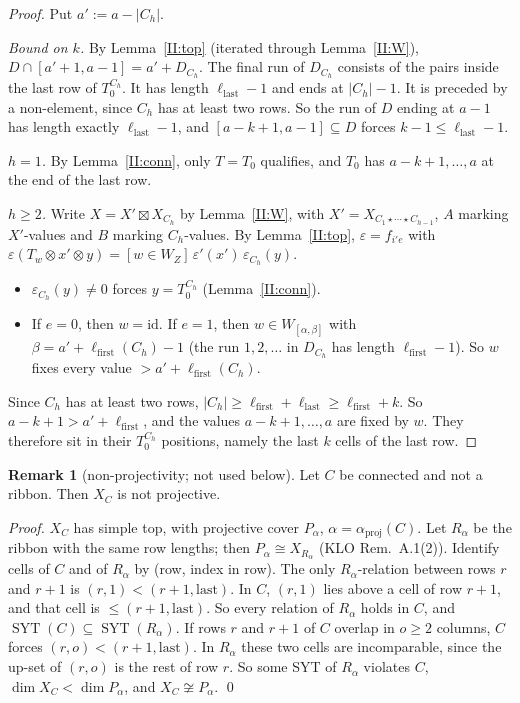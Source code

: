 \documentclass[11pt]{amsart}
\newcommand{\SYT}{\operatorname{SYT}}
\newcommand{\sq}{\boxtimes}
\theoremstyle{plain}
\theoremstyle{definition}
\newtheorem{remarkII}[lemmaII]{Remark}
\begin{document}
\begin{proof}
Put $a':=a-|C_h|$.

\emph{Bound on $k$.} By Lemma~\ref{II:top} (iterated through Lemma~\ref{II:W}), $D\cap[a'+1,a-1]=a'+D_{C_h}$. The final run of $D_{C_h}$ consists of the pairs inside the last row of $T_0^{C_h}$. It has length $\ell_{\mathrm{last}}-1$ and ends at $|C_h|-1$. It is preceded by a non-element, since $C_h$ has at least two rows. So the run of $D$ ending at $a-1$ has length exactly $\ell_{\mathrm{last}}-1$, and $[a-k+1,a-1]\subseteq D$ forces $k-1\le\ell_{\mathrm{last}}-1$.

\emph{$h=1$.} By Lemma~\ref{II:conn}, only $T=T_0$ qualifies, and $T_0$ has $a-k+1,\dots,a$ at the end of the last row.

\emph{$h\ge2$.} Write $X=X'\sq X_{C_h}$ by Lemma~\ref{II:W}, with $X'=X_{C_1\star\cdots\star C_{h-1}}$, $A$ marking $X'$-values and $B$ marking $C_h$-values. By Lemma~\ref{II:top}, $\varepsilon=f_{i'e}$ with $\varepsilon(T_w\otimes x'\otimes y)=[w\in W_Z]\,\varepsilon'(x')\,\varepsilon_{C_h}(y)$.
\begin{itemize}[itemsep=1pt]
\item $\varepsilon_{C_h}(y)\ne0$ forces $y=T_0^{C_h}$ (Lemma~\ref{II:conn}).
\item If $e=0$, then $w=\mathrm{id}$. If $e=1$, then $w\in W_{[\alpha,\beta]}$ with $\beta=a'+\ell_{\mathrm{first}}(C_h)-1$ (the run $1,2,\dots$ in $D_{C_h}$ has length $\ell_{\mathrm{first}}-1$). So $w$ fixes every value $>a'+\ell_{\mathrm{first}}(C_h)$.
\end{itemize}
Since $C_h$ has at least two rows, $|C_h|\ge\ell_{\mathrm{first}}+\ell_{\mathrm{last}}\ge\ell_{\mathrm{first}}+k$. So $a-k+1>a'+\ell_{\mathrm{first}}$, and the values $a-k+1,\dots,a$ are fixed by $w$. They therefore sit in their $T_0^{C_h}$ positions, namely the last $k$ cells of the last row.
\end{proof}

\begin{remarkII}[non-projectivity; not used below]\label{II:nonproj}
Let $C$ be connected and not a ribbon. Then $X_C$ is not projective.

\emph{Proof.} $X_C$ has simple top, with projective cover $P_\alpha$, $\alpha=\alpha_{\mathrm{proj}}(C)$. Let $R_\alpha$ be the ribbon with the same row lengths; then $P_\alpha\cong X_{R_\alpha}$ (KLO Rem.~A.1(2)). Identify cells of $C$ and of $R_\alpha$ by (row, index in row). The only $R_\alpha$-relation between rows $r$ and $r+1$ is $(r,1)<(r+1,\text{last})$. In $C$, $(r,1)$ lies above a cell of row $r+1$, and that cell is $\le(r+1,\text{last})$. So every relation of $R_\alpha$ holds in $C$, and $\SYT(C)\subseteq\SYT(R_\alpha)$. If rows $r$ and $r+1$ of $C$ overlap in $o\ge2$ columns, $C$ forces $(r,o)<(r+1,\text{last})$. In $R_\alpha$ these two cells are incomparable, since the up-set of $(r,o)$ is the rest of row $r$. So some SYT of $R_\alpha$ violates $C$, $\dim X_C<\dim P_\alpha$, and $X_C\not\cong P_\alpha$. \qed
\end{remarkII}
\end{document}

